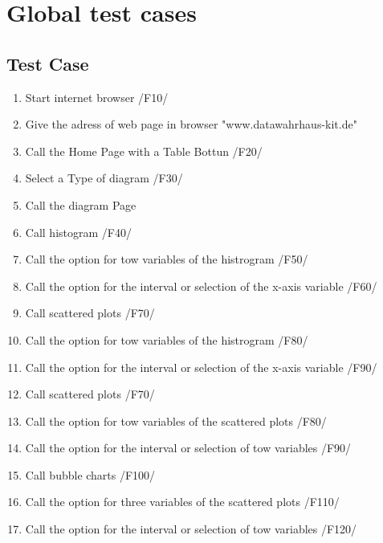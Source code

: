 \section{Global test cases}

\renewcommand{\theenumi}{/T\arabic{enumi}0/}
\renewcommand{\labelenumi}{\theenumi}

\subsection{Test Case}

\begin{enumerate}


\item Start internet browser /F10/

\item Give the adress of web page in browser "www.datawahrhaus-kit.de"

\item Call the Home Page  with a Table Bottun /F20/

\item Select a Type of diagram /F30/

\item Call the diagram Page 

\item Call histogram /F40/

\item Call the option for tow variables of the histrogram /F50/

\item Call the option for the interval or selection of the x-axis variable /F60/

\item Call  scattered plots  /F70/

\item Call the option for tow variables of the histrogram /F80/

\item Call the option for the interval or selection of the x-axis variable /F90/

\item Call  scattered plots  /F70/

\item Call the option for tow variables of the scattered plots /F80/

\item Call the option for the interval or selection of tow variables /F90/

\item Call  bubble charts /F100/

\item Call the option for three variables of the scattered plots /F110/

\item Call the option for the interval or selection of tow variables /F120/



\end{enumerate}
